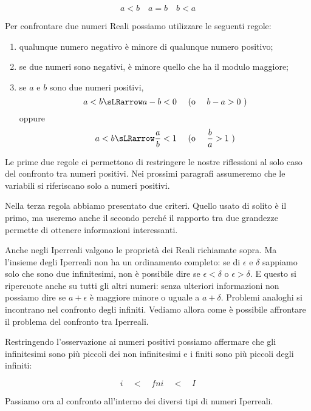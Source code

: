 \[a<b \quad a=b \quad b<a\]

Per confrontare due numeri Reali possiamo utilizzare le seguenti regole:

\begin{enumerate} [noitemsep]
 \item qualunque numero negativo è minore di qualunque numero positivo;
 \item se due numeri sono negativi, è minore quello che ha il modulo 
maggiore;
 \item se \(a\) e \(b\) sono due numeri positivi, 
 \[a<b \sLRarrow a-b<0 \quad \text{ (o } \quad b-a>0 \text{ )}\]
oppure
 \[a<b \sLRarrow \frac{a}{b}<1 \quad \text{ (o } \quad \frac{b}{a}>1 
   \text{ )}\]
\end{enumerate}

\begin{osservazione}
Le prime due regole ci permettono di restringere le nostre riflessioni al 
solo caso del confronto tra numeri positivi.
Nei prossimi paragrafi assumeremo che le variabili si riferiscano solo a 
numeri positivi.
\end{osservazione}

\begin{osservazione}
Nella terza regola abbiamo presentato due criteri. Quello usato di solito
è il primo, ma useremo anche il secondo perché il rapporto tra due 
grandezze permette di ottenere informazioni interessanti.
\end{osservazione}

\vspace{1em}

Anche negli Iperreali valgono le proprietà dei Reali richiamate sopra. 
Ma l'insieme degli Iperreali non ha un ordinamento completo:
se di \(\epsilon\) e \(\delta\) sappiamo solo che sono due infinitesimi,
non è possibile dire se \(\epsilon < \delta\) o \(\epsilon > \delta\).
E questo si ripercuote anche su tutti gli altri numeri: senza ulteriori 
informazioni non possiamo dire se \(a+\epsilon\) è maggiore minore o uguale 
a \(a+\delta\). 
Problemi analoghi si incontrano nel confronto degli infiniti.
Vediamo allora come è possibile affrontare il problema del confronto tra 
Iperreali.

Restringendo l'osservazione ai numeri positivi possiamo affermare che gli 
infinitesimi sono più piccoli dei non infinitesimi e i finiti sono più 
piccoli degli infiniti:

\[i \quad < \quad fni \quad < \quad I\]

Passiamo ora al confronto all'interno dei diversi tipi di numeri Iperreali.

